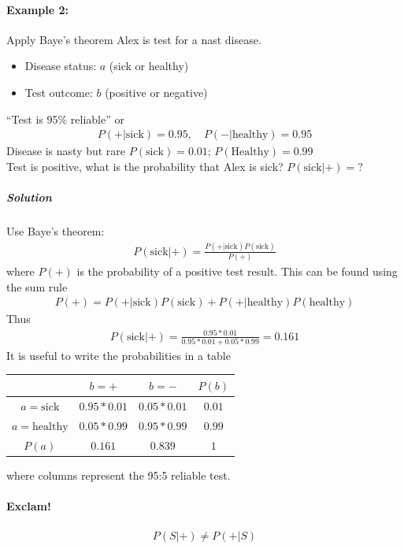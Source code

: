 \documentclass[../main.tex]{subfiles}
\begin{document}
\paragraph{Example 2:} Apply Baye's theorem
Alex is test for a nast disease.
\begin{itemize}
    \item Disease status: $a$ (sick or healthy)
    \item Test outcome: $b$ (positive or negative)
\end{itemize}
``Test is 95\% reliable'' or
\begin{align*}
    P(+|\textrm{sick}) = 0.95, \quad P(-|\textrm{healthy}) = 0.95
\end{align*}
Disease is nasty but rare $P(\textrm{sick}) = 0.01$; $P(\textrm{Healthy}) = 0.99$\\
Test is positive, what is the probability that Alex is sick? $P(\textrm{sick}|+)=?$
\subparagraph*{Solution} Use Baye's theorem:
\begin{align*}
    P(\textrm{sick}|+) = \frac{P(+|\textrm{sick}) P(\textrm{sick})}{P(+)}  
\end{align*}
where $P(+)$ is the probability of a positive test result. This can be found using the sum rule
\begin{align*}
    P(+) = P(+|\textrm{sick}) P(\textrm{sick}) + P(+|\textrm{healthy}) P(\textrm{healthy})
\end{align*}
Thus
\begin{align*}
    P(\textrm{sick}|+) = \frac{0.95*0.01}{0.95*0.01 + 0.05*0.99} = 0.161
\end{align*}
It is useful to write the probabilities in a table
\begin{center}
    \begin{tabular}{c|c|c|c}
        & $b = +$ & $b = -$ & $P(b)$ \\
        \hline
        $a = \textrm{sick}$ & $0.95*0.01$ & $0.05*0.01$ & $0.01$ \\
        $a = \textrm{healthy}$ & $0.05*0.99$ & $0.95*0.99$ & $0.99$ \\
        \hline
        $P(a)$ & $0.161$ & $0.839$ & $1$
    \end{tabular}
\end{center}
where columns represent the 95:5 reliable test.
\paragraph{Exclam!}
\begin{align*}
    P(S|+) \neq P(+|S)
\end{align*}
\end{document}
